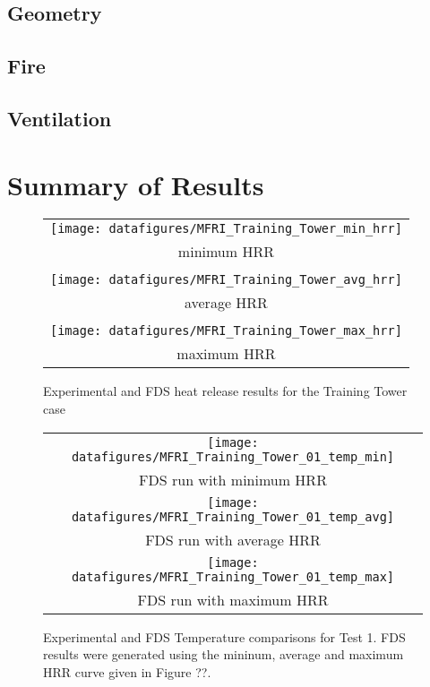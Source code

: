 \documentclass[11pt]{book}
\begin{document}
\subsection{Geometry}

\subsection{Fire}

\subsection{Ventilation}

\section{Summary of Results}

\begin{figure}[\figoptions]
\begin{center}
\begin{tabular}{c}
 \texttt{[image: datafigures/MFRI\_Training\_Tower\_min\_hrr]}\\
 minimum HRR\\
 \\
 \texttt{[image: datafigures/MFRI\_Training\_Tower\_avg\_hrr]}\\
 average HRR\\
 \\
 \texttt{[image: datafigures/MFRI\_Training\_Tower\_max\_hrr]}\\
 maximum HRR\\
\end{tabular}
\end{center}
\caption {Experimental and FDS heat release results for the
Training Tower case}
\label{figtrainingtowerhrr}%
\end{figure}

\begin{figure}[\figoptions]
\begin{center}
\begin{tabular}{c}
\texttt{[image: datafigures/MFRI\_Training\_Tower\_01\_temp\_min]}\\
FDS run with minimum HRR\\

\texttt{[image: datafigures/MFRI\_Training\_Tower\_01\_temp\_avg]}\\
FDS run with average HRR\\

\texttt{[image: datafigures/MFRI\_Training\_Tower\_01\_temp\_max]}\\
FDS run with maximum HRR\\
\end{tabular}
\end{center}
\caption {Experimental and FDS Temperature comparisons for Test 1.
FDS results were generated using the mininum, average and maximum HRR curve given in Figure ??.
}
\label{figtrainingtowerhrr}%
\end{figure}
\end{document}
